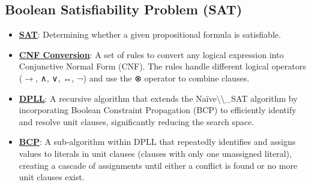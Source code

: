 \documentclass{article}%
\begin{document}
\subsection{Boolean Satisfiability Problem (SAT)}%
\label{subsec:BooleanSatisfiabilityProblem(SAT)}%
\begin{itemize}[leftmargin=*]%
\item \href{https://purdue.brightspace.com/d2l/common/assets/pdfjs-d2l-dist/1.0.14-legacy/web/viewer.html?file=\%2Fcontent\%2Fenforced\%2F1095467-wl.202510.CS.24300.001\%2F13L1-Logic.pdf\%3Fou\%3D1095467\&lang=en-us\&container=d2l-fileviewer-rendered-pdf\&fullscreen=d2l-fileviewer-rendered-pdf-dialog\&height=667#page=15}{\textbf{SAT}}: Determining whether a given propositional formula is satisfiable.%
\item \href{https://purdue.brightspace.com/d2l/common/assets/pdfjs-d2l-dist/1.0.14-legacy/web/viewer.html?file=\%2Fcontent\%2Fenforced\%2F1095467-wl.202510.CS.24300.001\%2F13L1-Logic.pdf\%3Fou\%3D1095467\&lang=en-us\&container=d2l-fileviewer-rendered-pdf\&fullscreen=d2l-fileviewer-rendered-pdf-dialog\&height=667#page=17}{\textbf{CNF Conversion}}: A set of rules to convert any logical expression into Conjunctive Normal Form (CNF). The rules handle different logical operators ($\rightarrow$, ∧, ∨, ↔, ¬) and use the ⊗ operator to combine clauses.%
\item \href{https://purdue.brightspace.com/d2l/common/assets/pdfjs-d2l-dist/1.0.14-legacy/web/viewer.html?file=\%2Fcontent\%2Fenforced\%2F1095467-wl.202510.CS.24300.001\%2F15L2-SAT.pdf\%3Fou\%3D1095467\&lang=en-us\&container=d2l-fileviewer-rendered-pdf\&fullscreen=d2l-fileviewer-rendered-pdf-dialog\&height=667#page=17}{\textbf{DPLL}}: A recursive algorithm that extends the Naïve\textbackslash{}\textbackslash{}_SAT algorithm by incorporating Boolean Constraint Propagation (BCP) to efficiently identify and resolve unit clauses, significantly reducing the search space.%
\item \href{https://purdue.brightspace.com/d2l/common/assets/pdfjs-d2l-dist/1.0.14-legacy/web/viewer.html?file=\%2Fcontent\%2Fenforced\%2F1095467-wl.202510.CS.24300.001\%2F15L2-SAT.pdf\%3Fou\%3D1095467\&lang=en-us\&container=d2l-fileviewer-rendered-pdf\&fullscreen=d2l-fileviewer-rendered-pdf-dialog\&height=667#page=20}{\textbf{BCP}}: A sub-algorithm within DPLL that repeatedly identifies and assigns values to literals in unit clauses (clauses with only one unassigned literal), creating a cascade of assignments until either a conflict is found or no more unit clauses exist.%

\end{itemize}
\end{document}
